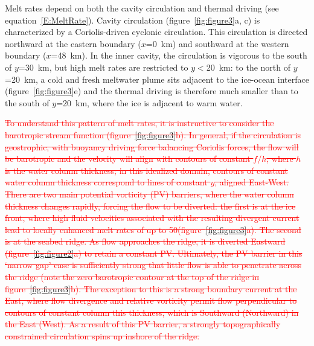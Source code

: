 \documentclass[draft]{agujournal2019}
\newcommand{\red}[1]{\textcolor{red}{#1}}
\newcommand{\rout}[1]{\red{\sout{#1}}}
\begin{document}
Melt rates depend on both the cavity circulation and thermal driving (see equation~\eqref{E:MeltRate}). Cavity circulation (figure~\ref{fig:figure3}a, c) is characterized by a Coriolis-driven cyclonic circulation. This circulation is directed northward at the eastern boundary ($x$=0~km) and southward at the western boundary ($x$=48~km). In the inner cavity, the circulation is vigorous to the south of $y$=30~km, but high melt rates are restricted to $y<$20~km: to the north of $y$=20~km, a cold and fresh meltwater plume sits adjacent to the ice-ocean interface (figure~\ref{fig:figure3}e) and the thermal driving is therefore much smaller than to the south of $y$=20~km, where the ice is adjacent to warm water.


\rout{To understand this pattern of melt rates, it is instructive to consider the barotropic stream function (figure~\ref{fig:figure3}b). In general, if the circulation is geostrophic, with buoyancy driving force balancing Coriolis forces, the flow will be barotropic and the velocity will align with contours of constant $f/h$, where $h$ is the water column thickness; in this idealized domain, contours of constant water column thickness correspond to lines of constant $y$, aligned East-West. There are two main potential vorticity (PV) barriers, where the water column thickness changes rapidly, forcing the flow to be diverted: the first is at the ice front, where high fluid velocities associated with the resulting divergent current lead to locally enhanced melt rates of up to 50\mpryr (figure~\ref{fig:figure3}a). The second is at the seabed ridge. As flow approaches the ridge, it is diverted Eastward (figure~\ref{fig:figure2}a) to retain a constant PV. Ultimately, the PV barrier in this `narrow gap' case is sufficiently strong that little flow is able to penetrate across the ridge (note the zero barotropic contour at the top of the ridge in figure~\ref{fig:figure3}b). The exception to this is a strong boundary current at the East, where flow divergence and relative vorticity permit flow perpendicular to contours of constant column this thickness, which is Southward (Northward) in the East (West). As a result of this PV barrier, a strongly topographically constrained circulation spins up inshore of the ridge.} %
\end{document}
